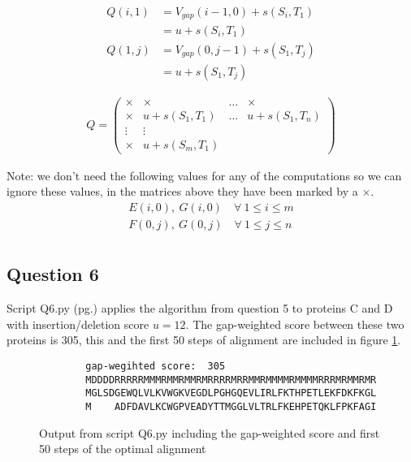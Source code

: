 \documentclass[a4paper]{article}
\begin{document}
\begin{figure}[H]
    \centering
    \begin{minipage}{0.48\textwidth}
        \centering
        \begin{align*}
            Q(i,1) &= V_{gap}(i-1,0) + s(S_i,T_1) \\
                   &= u + s(S_i,T_1) \\
            Q(1,j) &= V_{gap}(0,j-1) + s(S_1,T_j) \\
                   &= u + s(S_1,T_j)
        \end{align*}
    \end{minipage}\hfill
    \begin{minipage}{0.48\textwidth}
        \centering
        \begin{align*}
            Q = \begin{pmatrix}
                \times & \times & \hdots & \times \\
                \times & u+s(S_1,T_1) &\hdots & u+s(S_1,T_n) \\
                \vdots & \vdots \\
                \times & u+s(S_m,T_1)
            \end{pmatrix}
        \end{align*}
    \end{minipage}
\end{figure}

Note: we don't need the following values for any of the computations so we can ignore these values, in the matrices above they have been marked by a $\times$.
\begin{align*}
    E(i,0),\ G(i,0) \quad \forall \ 1 \leq i \leq m \\
    F(0,j),\ G(0,j) \quad \forall \ 1 \leq j \leq n \\
\end{align*}

\subsection*{Question 6}

Script Q6.py (pg.\pageref{PQ6}) applies the algorithm from question 5 to proteins C and D with insertion/deletion score $u=12$. The gap-weighted score between these two proteins is 305, this and the first 50 steps of alignment are included in figure \ref{fig:q6}.

\begin{figure}[H]
    \centering
    \begin{verbatim}
        gap-wegihted score:  305
        MDDDDRRRRRMMMRMMRMMRMRRRRMRRMMRMMMMRMMMMRRRMRMMRMR
        MGLSDGEWQLVLKVWGKVEGDLPGHGQEVLIRLFKTHPETLEKFDKFKGL
        M    ADFDAVLKCWGPVEADYTTMGGLVLTRLFKEHPETQKLFPKFAGI
    \end{verbatim}
    \caption{Output from script Q6.py including the gap-weighted score and first 50 steps of the optimal alignment}
    \label{fig:q6}
\end{figure}
\end{document}
